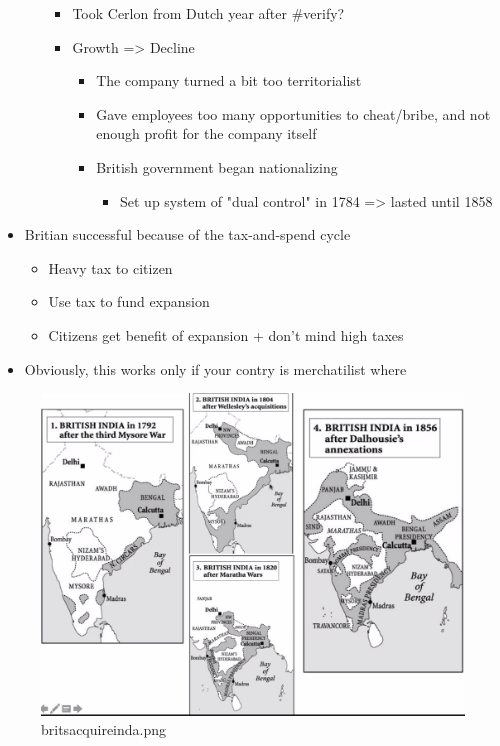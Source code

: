 \documentclass[letterpaper]{article}
\begin{document}
\begin{itemize}
\begin{itemize}
\begin{itemize}
\item Took Cerlon from Dutch year after \#verify?
\item Growth => Decline

\begin{itemize}
\item The company turned a bit too territorialist
\item Gave employees too many opportunities to cheat/bribe, and not
enough profit for the company itself
\item British government began nationalizing

\begin{itemize}
\item Set up system of "dual control" in 1784 => lasted until 1858
\end{itemize}
\end{itemize}
\end{itemize}
\end{itemize}

\item Britian successful because of the tax-and-spend cycle

\begin{itemize}
\item Heavy tax to citizen
\item Use tax to fund expansion
\item Citizens get benefit of expansion + don't mind high taxes
\end{itemize}

\item Obviously, this works only if your contry is merchatilist where
\end{itemize}

\begin{figure}[htbp]
\centering
\includegraphics[width=.9\linewidth]{britsacquireinda.png}
\caption{britsacquireinda.png}
\end{figure}
\end{document}
